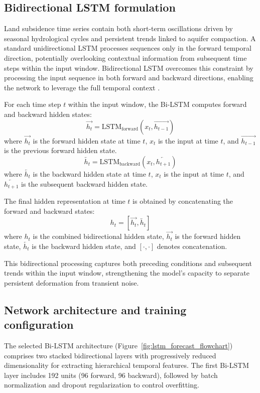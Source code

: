 \documentclass[oneside,doublespacing,flushright]{lsuthesis}
\begin{document}
\subsection{Bidirectional LSTM formulation}
Land subsidence time series contain both short-term oscillations driven by seasonal hydrological cycles and persistent trends linked to aquifer compaction. A standard unidirectional LSTM processes sequences only in the forward temporal direction, potentially overlooking contextual information from subsequent time steps within the input window. Bidirectional LSTM overcomes this constraint by processing the input sequence in both forward and backward directions, enabling the network to leverage the full temporal context \citep{Schuster1997}.

For each time step $t$ within the input window, the Bi-LSTM computes forward and backward hidden states:
\begin{equation}
\overrightarrow{h_t} = \text{LSTM}_{\text{forward}}(x_t, \overrightarrow{h_{t-1}})
\end{equation}
where $\overrightarrow{h_t}$ is the forward hidden state at time $t$, $x_t$ is the input at time $t$, and $\overrightarrow{h_{t-1}}$ is the previous forward hidden state.
\begin{equation}
\overleftarrow{h_t} = \text{LSTM}_{\text{backward}}(x_t, \overleftarrow{h_{t+1}})
\end{equation}
where $\overleftarrow{h_t}$ is the backward hidden state at time $t$, $x_t$ is the input at time $t$, and $\overleftarrow{h_{t+1}}$ is the subsequent backward hidden state.

The final hidden representation at time $t$ is obtained by concatenating the forward and backward states:
\begin{equation}
h_t = [\overrightarrow{h_t}, \overleftarrow{h_t}]
\end{equation}
where $h_t$ is the combined bidirectional hidden state, $\overrightarrow{h_t}$ is the forward hidden state, $\overleftarrow{h_t}$ is the backward hidden state, and $[\cdot, \cdot]$ denotes concatenation.

This bidirectional processing captures both preceding conditions and subsequent trends within the input window, strengthening the model's capacity to separate persistent deformation from transient noise.

\subsection{Network architecture and training configuration}
The selected Bi-LSTM architecture (Figure~\ref{fig:lstm_forecast_flowchart}) comprises two stacked bidirectional layers with progressively reduced dimensionality for extracting hierarchical temporal features. 
The first Bi-LSTM layer includes 192 units (96 forward, 96 backward), followed by batch normalization and dropout regularization to control overfitting.
\end{document}
